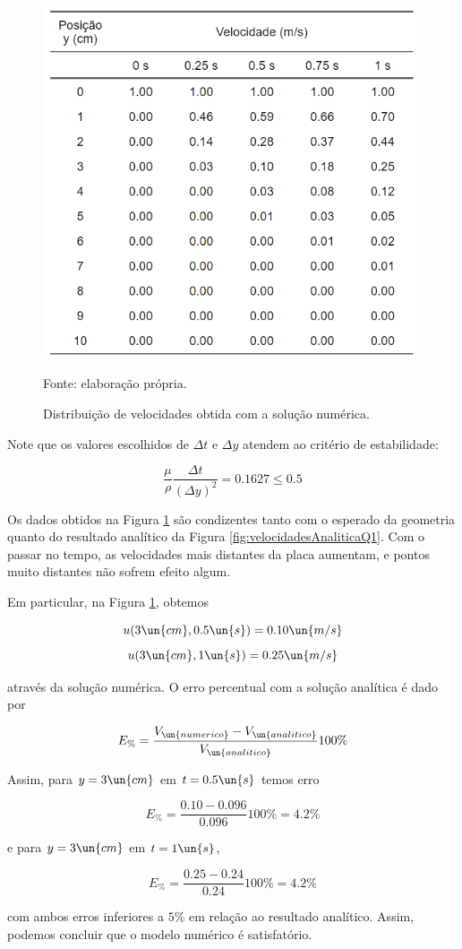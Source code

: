 \begin{figure}[h!]
    \caption{Distribuição de velocidades obtida com a solução numérica.}
    \label{fig:tabelaNumericaQ1}
    \centering
    \centerline{\includegraphics[scale=0.75]{tabelaNumericaQ1.png}}
    \par{Fonte: elaboração própria.}
\end{figure}

Note que os valores escolhidos de $\Delta t$ e $\Delta y$ atendem ao critério de estabilidade:

\[ \frac{\mu}{\rho} \frac{\Delta t}{\left(\Delta y\right)^2} = 0.1627 \leq 0.5 \]

Os dados obtidos na Figura \ref*{fig:tabelaNumericaQ1} são condizentes tanto com o esperado da geometria
quanto do resultado analítico da Figura \eqref{fig:velocidadesAnaliticaQ1}. Com o passar no tempo,
as velocidades mais distantes da placa aumentam, e pontos muito distantes não sofrem efeito 
algum.

Em particular, na Figura \ref*{fig:tabelaNumericaQ1}, obtemos 

\[ u(3 \un{cm}, 0.5 \un{s}) = 0.10 \un{m/s} \]
\[ u(3 \un{cm}, 1 \un{s}) = 0.25 \un{m/s} \]

\noindent através da solução numérica. O erro percentual com a solução analítica é dado por 

\begin{equation}\label{eq:erroPercentual}
    E_{\%} = \frac{V_{\un{numerico}} - V_{\un{analitico}}}{V_{\un{analitico}}} 100\%
\end{equation}

Assim, para $y = 3 \un{cm}$ em $t = 0.5 \un{s}$ temos erro  

\[ E_{\%} = \frac{0.10 - 0.096}{0.096} 100\% = 4.2\% \]

\noindent e para $y = 3 \un{cm}$ em $t = 1 \un{s}$,

\[ E_{\%} = \frac{0.25- 0.24}{0.24} 100\% = 4.2\% \]

\noindent com ambos erros inferiores a $5\%$ em relação ao resultado analítico. Assim, podemos
concluir que o modelo numérico é satisfatório.


